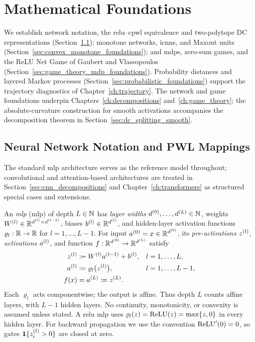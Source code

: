 \chapter{Mathematical Foundations}\label{ch:foundations}

We establish network notation, the \ac{relu}--\ac{cpwl} equivalence and two-polytope DC representations (Section~\ref{sec:nn_notation_pwl}); monotone networks, \acp{icnn}, and Maxout units (Section~\ref{sec:convex_monotone_foundations}); and \acp{mdp}, zero-sum games, and the ReLU Net Game of Gaubert and Vlassopoulos (Section~\ref{sec:game_theory_mdp_foundations}). Probability distances and layered Markov processes (Section~\ref{sec:probabilistic_foundations}) support the trajectory diagnostics of Chapter~\ref{ch:trajectory}. The network and game foundations underpin Chapters~\ref{ch:decompositions} and~\ref{ch:game_theory}; the absolute-curvature construction for smooth activations accompanies the decomposition theorem in Section~\ref{sec:dc_splitting_smooth}.

\section{Neural Network Notation and PWL Mappings}\label{sec:nn_notation_pwl}

The standard \ac{mlp} architecture serves as the reference model throughout; convolutional and attention-based architectures are treated in Section~\ref{sec:cnn_decompositions} and Chapter~\ref{ch:transformers} as structured special cases and extensions.

\begin{definition}\label{def:ffn_relu}
An \emph{\acl{mlp}} (\acs{mlp}) of depth $L\in\mathbb{N}$ has \emph{layer widths} $d^{(0)},\ldots,d^{(L)}\in\mathbb{N}$, weights $W^{(l)}\in\mathbb{R}^{d^{(l)}\times d^{(l-1)}}$, biases $b^{(l)}\in\mathbb{R}^{d^{(l)}}$, and hidden-layer activation functions $\varrho_l:\mathbb{R}\to\mathbb{R}$ for $l=1,\ldots,L-1$. For input $a^{(0)}=x\in\mathbb{R}^{d^{(0)}}$, its \emph{pre-activations} $z^{(l)}$, \emph{activations} $a^{(l)}$, and function $f:\mathbb{R}^{d^{(0)}}\to\mathbb{R}^{d^{(L)}}$ satisfy
\begin{align}
	z^{(l)} &\coloneqq W^{(l)}a^{(l-1)}+b^{(l)}, && l=1,\ldots,L, \label{eq:forward_recursion}\\
	a^{(l)} &\coloneqq \varrho_l\bigl(z^{(l)}\bigr), && l=1,\ldots,L-1, \notag\\
	f(x) &= a^{(L)}\coloneqq z^{(L)}. \label{eq:network_function}
\end{align}
Each $\varrho_l$ acts componentwise; the output is affine. Thus depth $L$ counts affine layers, with $L-1$ hidden layers. No continuity, monotonicity, or convexity is assumed unless stated. A \ac{relu} \ac{mlp} uses $\varrho_l(z)=\text{ReLU}(z)=\max\{z,0\}$ in every hidden layer. For backward propagation we use the convention $\text{ReLU}'(0)=0$, so gates $\mathbf{1}\{z^{(l)}_i>0\}$ are closed at zero.
\end{definition}

